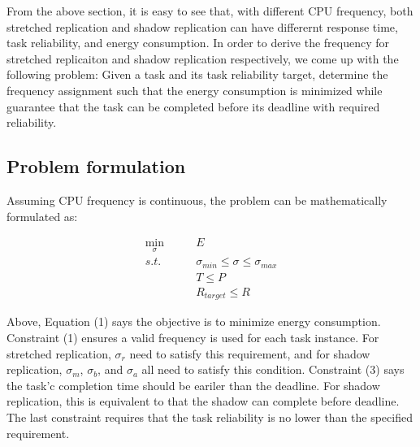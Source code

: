 From the above section, it is easy to see that, with different CPU frequency, both stretched replication and shadow replication can have differernt response time, task reliability, and energy consumption. In order to derive the frequency for stretched replicaiton and shadow replication respectively, we come up with the following problem: Given a task and its task reliability target, determine the frequency assignment such that the energy consumption is minimized while guarantee that the task can be completed before its deadline with required reliability. 

\subsection{Problem formulation}
Assuming CPU frequency is continuous, the problem can be mathematically formulated as:

\begin{align}
\min_{\sigma}\quad\quad    & E \\
s.t.              \quad\quad                   & \sigma_{min} \leq \sigma \leq \sigma_{max} \\
                                     & T \leq P \\
                                     & R_{target} \leq R 
\end{align} 


Above, Equation (1) says the objective is to minimize energy consumption. Constraint (1) ensures a valid frequency is used for each task instance. For stretched replication, $\sigma_r$ need to satisfy this requirement, and for shadow replication, $\sigma_m$, $\sigma_b$, and $\sigma_a$ all need to satisfy this condition. Constraint (3) says the task'c completion time should be eariler than the deadline. For shadow replication, this is equivalent to that the shadow can complete before deadline. The last constraint requires that the task reliability is no lower than the specified requirement. 

